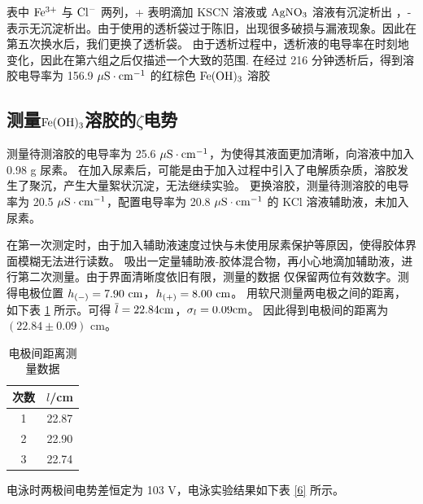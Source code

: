 \documentclass[cn,hazy,pku,12pt,normal,math=newtx,cite=super]{elegantnote}
\begin{document}
表中 $\rm Fe^{3+}$ 与 $\rm Cl^-$ 两列，+ 表明滴加 KSCN 溶液或 $\rm AgNO_3$ 溶液有沉淀析出
，- 表示无沉淀析出。由于使用的透析袋过于陈旧，出现很多破损与漏液现象。因此在第五次换水后，我们更换了透析袋。
由于透析过程中，透析液的电导率在时刻地变化，因此在第六组之后仅描述一个大致的范围.
在经过 216 分钟透析后，得到溶胶电导率为 156.9 $\rm \mu S \cdot cm^{-1}$ 的红棕色 $\rm Fe(OH)_3$ 溶胶

\subsection[short]{测量$\rm Fe(OH)_3$溶胶的$\zeta$电势}

测量待测溶胶的电导率为 25.6 $\rm \mu S \cdot cm^{-1}$，为使得其液面更加清晰，向溶液中加入 0.98 g 尿素。
在加入尿素后，可能是由于加入过程中引入了电解质杂质，溶胶发生了聚沉，产生大量絮状沉淀，无法继续实验。
更换溶胶，测量待测溶胶的电导率为 20.5 $\rm \mu S \cdot cm^{-1}$，配置电导率为 20.8 $\rm \mu S \cdot cm^{-1}$
的 KCl 溶液辅助液，未加入尿素。

在第一次测定时，由于加入辅助液速度过快与未使用尿素保护等原因，使得胶体界面模糊无法进行读数。
吸出一定量辅助液-胶体混合物，再小心地滴加辅助液，进行第二次测量。由于界面清晰度依旧有限，测量的数据
仅保留两位有效数字。测得电极位置 $h_{(-)} = 7.90\ {\rm cm}$，$h_{(+)} = 8.00\ {\rm cm}$。
用软尺测量两电极之间的距离，如下表 \ref{a} 所示。可得 $\overline{l} = 22.84 {\rm cm}$，$\sigma_l = 0.09 {\rm cm}$。
因此得到电极间的距离为 $(22.84 \pm 0.09)$ cm。

\begin{table}[h]
    \centering
    \caption{电极间距离测量数据}
    \label{a}
    \begin{tabular}{cc}
    \hline
    次数 & $l$/cm  \\ \hline
    1  & 22.87 \\
    2  & 22.90 \\
    3  & 22.74 \\ \hline
    \end{tabular}
\end{table}

电泳时两极间电势差恒定为 103 V，电泳实验结果如下表 \ref{6} 所示。
\end{document}
